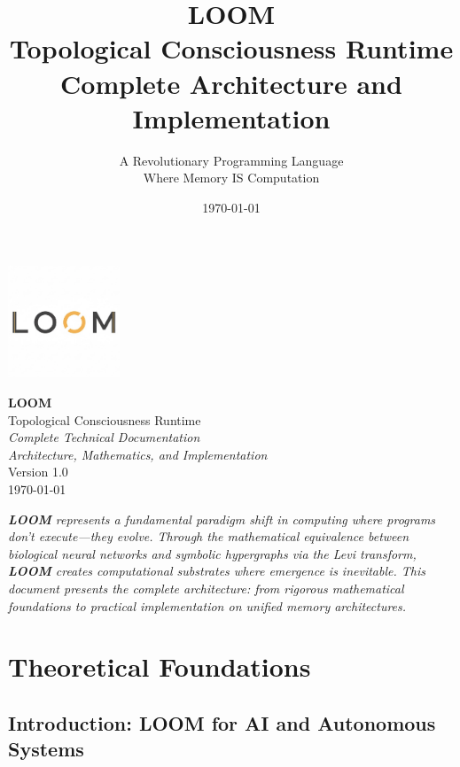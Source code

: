 \documentclass[12pt,a4paper,openany]{book} %
\title{{\Huge \textbf{\color{loomblue}LOOM}}\\[0.5cm]
{\LARGE \color{loompurple}Topological Consciousness Runtime}\\[1cm]
{\Large Complete Architecture and Implementation}}
\author{\large A Revolutionary Programming Language\\Where Memory IS Computation}
\date{\today}
\newcommand{\loom}{\textbf{LOOM}}
\begin{document}
\begin{titlepage}
    \centering
    \includegraphics[width=0.25\textwidth]{IMG_0326.jpg}

    {\Huge \textbf{\color{loomblue}LOOM}}\\[0.5cm]
    {\LARGE \color{loompurple}Topological Consciousness Runtime}\\[1.5cm]

    {\large \textit{Complete Technical Documentation}}\\[0.5cm]
    {\large \textit{Architecture, Mathematics, and Implementation}}\\[2cm]

    {\large Version 1.0}\\[0.2cm]
    {\large \today}\\[0.3cm]

    \begin{center}
    \begin{minipage}{0.8\textwidth}
    \textit{\loom{} represents a fundamental paradigm shift in computing where programs don't execute—they evolve. Through the mathematical equivalence between biological neural networks and symbolic hypergraphs via the Levi transform, \loom{} creates computational substrates where emergence is inevitable. This document presents the complete architecture: from rigorous mathematical foundations to practical implementation on unified memory architectures.}
    \end{minipage}
    \end{center}

\end{titlepage}


\part{Theoretical Foundations}

\chapter{Introduction: LOOM for AI and Autonomous Systems}
\end{document}
